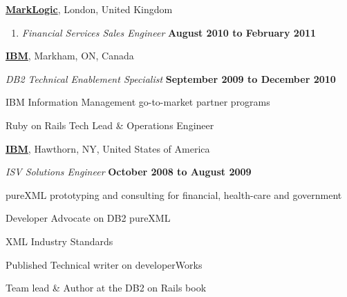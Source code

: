 \documentclass[10pt]{article}
\newenvironment{outerlist}[1][\enskip\textbullet]%
        {\begin{enumerate}[#1]}{\end{enumerate}%
         \vspace{-.6\baselineskip}}
\newenvironment{innerlist}[1][\enskip\textbullet]%
        {\begin{compactenum}[#1]}{\end{compactenum}}
\newcommand{\blankline}{\quad\pagebreak[2]}
\begin{document}
\blankline

\href{http://www.marklogic.com/}{\textbf{MarkLogic}}, 
London, United Kingdom
\begin{outerlist}

  \item[] \textit{Financial Services Sales Engineer}%
          \hfill \textbf{August 2010 to February 2011}
\end{outerlist}


\blankline

\href{http://www.ibm.com/}{\textbf{IBM}}, 
Markham, ON, Canada
\begin{outerlist}

  \item[] \textit{DB2 Technical Enablement Specialist}%
          \hfill \textbf{September 2009 to December 2010}
  \begin{innerlist}
\item IBM Information Management go-to-market partner programs
\item Ruby on Rails Tech Lead \& Operations Engineer
  \end{innerlist}

\end{outerlist}

\blankline

\href{http://www.ibm.com/}{\textbf{IBM}}, 
Hawthorn, NY, United States of America
\begin{outerlist}

  \item[] \textit{ISV Solutions Engineer}%
          \hfill \textbf{October 2008 to August 2009}
  \begin{innerlist}
\item pureXML prototyping and consulting for financial, health-care and government
\item Developer Advocate on DB2 pureXML
\item XML Industry Standards
\item Published Technical writer on developerWorks
\item Team lead \& Author at the DB2 on Rails book
  \end{innerlist}

\end{outerlist}


%
%
\end{document}
